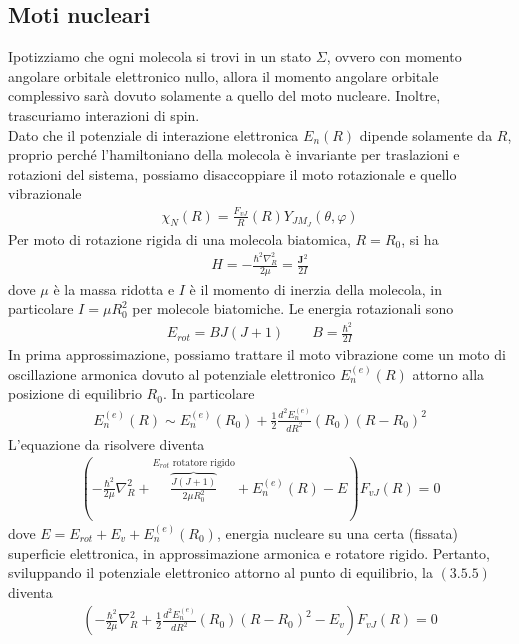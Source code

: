 \documentclass{article}
\begin{document}
\subsection{Moti nucleari}
Ipotizziamo che ogni molecola si trovi in un stato $\Sigma$, ovvero con momento angolare orbitale elettronico nullo, allora il momento angolare orbitale complessivo sarà dovuto solamente a quello del moto nucleare. Inoltre, trascuriamo interazioni di spin. \\
Dato che il potenziale di interazione elettronica $E_n(R)$ dipende solamente da $R$, proprio perché l'hamiltoniano della molecola è invariante per traslazioni e rotazioni del sistema, possiamo disaccoppiare il moto rotazionale e quello vibrazionale
\begin{align}
    \chi_N(R) = \frac{F_{vJ}}{R}(R)Y_{JM_J}(\theta, \varphi) \tag{3.5.1}
\end{align}
Per moto di rotazione rigida di una molecola biatomica, $R = R_0$, si ha 
\begin{align}
    H = -\frac{\hbar^2\nabla^2_R}{2\mu} = \frac{\mathbf{J}^2}{2I} \tag{3.5.2}
\end{align}
dove $\mu$ è la massa ridotta e $I$ è il momento di inerzia della molecola, in particolare $I = \mu R^2_0$ per molecole biatomiche. Le energia rotazionali sono 
\begin{align}
    E_{rot} = BJ(J + 1) \qquad B = \frac{\hbar^2}{2I} \tag{3.5.3}
\end{align}
In prima approssimazione, possiamo trattare il moto vibrazione come un moto di oscillazione armonica dovuto al potenziale elettronico $E^{(e)}_n(R)$ attorno alla posizione di equilibrio $R_0$. In particolare 
\begin{align}
    E^{(e)}_n(R) \sim E^{(e)}_n(R_0) + \frac{1}{2}\frac{d^2E^{(e)}_n}{dR^2}(R_0)(R - R_0)^2 \tag{3.5.4}
\end{align}
L'equazione da risolvere diventa 
\begin{align}
    \left(-\frac{\hbar^2}{2\mu}\nabla^2_R + \overbrace{\frac{J(J + 1)}{2\mu R^2_0}}^{E_{rot} \text{ rotatore rigido}} + E^{(e)}_n(R) - E\right)F_{vJ}(R) = 0 \tag{3.5.5}
\end{align}
dove $E = E_{rot} + E_v + E^{(e)}_n(R_0)$, energia nucleare su una certa (fissata) superficie elettronica, in approssimazione armonica e rotatore rigido. Pertanto, sviluppando il potenziale elettronico attorno al punto di equilibrio, la $(3.5.5)$ diventa 
\begin{align}
    \left(-\frac{\hbar^2}{2\mu}\nabla^2_R + \frac{1}{2}\frac{d^2E^{(e)}_n}{dR^2}(R_0)(R - R_0)^2 - E_v\right)F_{vJ}(R) = 0 \tag{3.5.6}
\end{align}
\end{document}
